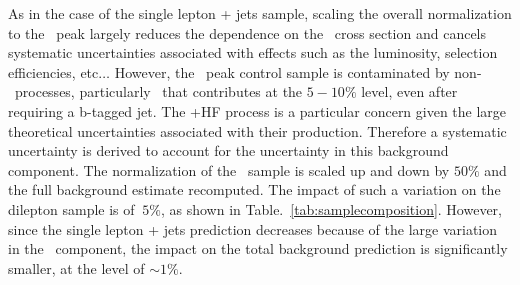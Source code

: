As in the case of the single lepton + jets sample, scaling the overall 
normalization to the \mt\ peak largely reduces the dependence on the
\ttbar\ cross section and cancels systematic uncertainties associated
with effects such as the luminosity, selection efficiencies,
etc$\dots$ However, the \mt\ peak control sample is contaminated 
by non-\ttbar\ processes, particularly \wjets\ that contributes at
the $5-10\%$ level, even after requiring a b-tagged jet. The \wjets+HF
process is a particular concern given the large theoretical
uncertainties associated with their production. 
Therefore a systematic uncertainty is derived to account for
the uncertainty in this background component. The normalization of 
the \wjets\ sample is scaled up and down by $50\%$ and the full 
background estimate recomputed. The impact of such a variation on 
the dilepton sample is of $~5\%$, as shown in 
Table.~\ref{tab:samplecomposition}. However, since the
single lepton + jets prediction decreases because of the large
variation in the \wjets\ component, the impact on the total background
prediction is significantly smaller, at the level of $\sim 1\%$.

